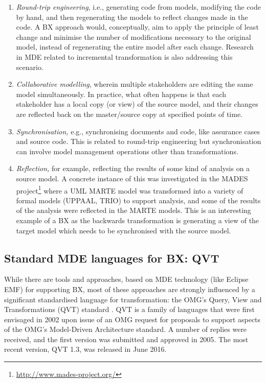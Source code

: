 \begin{enumerate}
\item \textit{Round-trip engineering}, i.e., generating code from models, modifying the code by hand, and then regenerating the models to reflect changes made in the code. A BX approach would, conceptually, aim to apply the principle of least change and minimise the number of modifications necessary to the original model, instead of regenerating the entire model after each change. Research in MDE related to incremental transformation is also addressing this scenario.

\item \textit{Collaborative modelling}, wherein multiple stakeholders are editing the same model simultaneously. In practice, what often happens is that each stakeholder has a local copy (or view) of the source model, and their changes are reflected back on the master/source copy at specified points of time.

\item \textit{Synchronisation,} e.g., synchronising documents and code, like assurance cases and source code. This is related to round-trip engineering but synchronisation can involve model management operations other than transformations.

\item \textit{Reflection,} for example, reflecting the results of some kind of analysis on a source model. A concrete instance of this was investigated in the MADES project\footnote{\url{http://www.mades-project.org/}} where a UML MARTE model was transformed into a variety of formal models (UPPAAL, TRIO) to support analysis, and some of the results of the analysis were reflected in the MARTE models. This is an interesting example of a BX as the backwards transformation is generating a view of the target model which needs to be synchronised with the source model.
\end{enumerate}

\subsection{Standard MDE languages for BX: QVT}
While there are tools and approaches, based on MDE technology (like Eclipse EMF) for supporting BX, most of these approaches are strongly influenced by a significant standardised language for transformation: the OMG's Query, View and Transformations (QVT) standard \cite{QVT-specification}. QVT is a family of languages that were first envisaged in 2002 upon issue of an OMG request for proposals to support aspects of the OMG's Model-Driven Architecture standard. A number of replies were received, and the first version was submitted and approved in 2005. The most recent version, QVT 1.3, was released in June 2016. 

